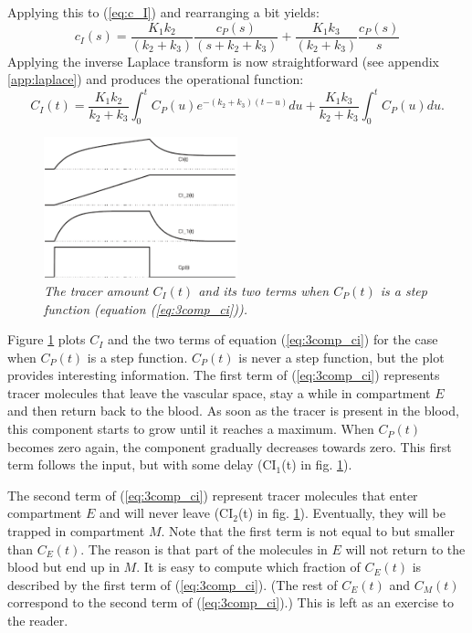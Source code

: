 \documentclass[11pt,oneside]{article}
\begin{document}
Applying this to (\ref{eq:c_I}) and rearranging a bit yields:
\begin{equation}
  c_I(s) = \frac{K_1 k_2}{(k_2 + k_3)} \frac{c_P(s)}{(s + k_2 + k_3)} + 
           \frac{K_1 k_3}{(k_2 + k_3)} \frac{c_P(s)}{s}
\end{equation}
Applying the inverse Laplace transform is now straightforward (see appendix
\ref{app:laplace}) and produces the operational function:
\begin{equation}
  C_I(t) = \frac{K_1 k_2}{k_2 + k_3} \int_0^t C_P(u) e^{-(k_2 + k_3)(t - u)}du
         + \frac{K_1 k_3}{k_2 + k_3} \int_0^t C_P(u) du. \label{eq:3comp_ci}
\end{equation}

\begin{figure}[tb]
\centering
\includegraphics[width=0.5\textwidth]{figs/fig_3comp_ci.pdf}
\caption{\label{fig:3comp_ci} \emph{The tracer amount $C_I(t)$ and its two
terms when $C_P(t)$ is a step function (equation (\ref{eq:3comp_ci})).}}
\end{figure}
%
Figure \ref{fig:3comp_ci} plots $C_I$ and the two terms of equation
(\ref{eq:3comp_ci}) for the case when $C_P(t)$ is a step function. $C_P(t)$ is
never a step function, but the plot provides interesting information. The
first term of (\ref{eq:3comp_ci}) represents tracer molecules that leave the
vascular space, stay a while in compartment $E$ and then return back to the
blood. As soon as the tracer is present in the blood, this component starts to
grow until it reaches a maximum. When $C_P(t)$ becomes zero again, the
component gradually decreases towards zero. This first term follows the input,
but with some delay (CI$_1$(t) in fig. \ref{fig:3comp_ci}).

The second term of (\ref{eq:3comp_ci}) represent tracer molecules that
enter compartment $E$ and will never leave (CI$_2$(t) in
fig. \ref{fig:3comp_ci}). Eventually, they will be trapped in
compartment $M$. Note that the first term is not equal to but smaller
than $C_E(t)$. The reason is that part of the molecules in $E$ will
not return to the blood but end up in $M$. It is easy to compute which
fraction of $C_E(t)$ is described by the first term of
(\ref{eq:3comp_ci}). (The rest of $C_E(t)$ and $C_M(t)$ correspond to
the second term of (\ref{eq:3comp_ci}).) This is left as an exercise
to the reader.
\end{document}
